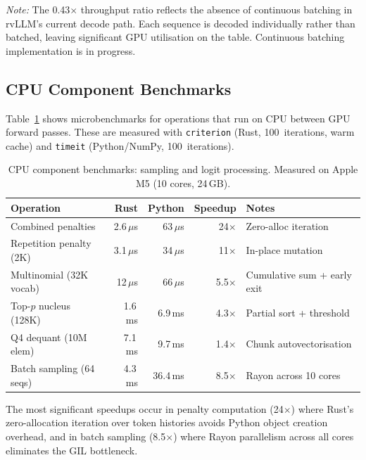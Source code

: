 \documentclass[11pt,a4paper]{article}
\newcommand{\thead}[1]{\textbf{\color{white}#1}}
\begin{document}
\smallskip\noindent\textit{Note:} The 0.43$\times$ throughput ratio reflects the
absence of continuous batching in rvLLM's current decode path. Each sequence is
decoded individually rather than batched, leaving significant GPU utilisation on the
table. Continuous batching implementation is in progress.

\subsection{CPU Component Benchmarks}

Table~\ref{tab:cpu_bench} shows microbenchmarks for operations that run on CPU between
GPU forward passes. These are measured with \texttt{criterion} (Rust, 100~iterations,
warm cache) and \texttt{timeit} (Python/NumPy, 100~iterations).

\begin{table}[t]
  \centering
  \caption{CPU component benchmarks: sampling and logit processing. Measured on Apple M5 (10 cores, 24\,GB).}
  \label{tab:cpu_bench}
  \small
  \begin{tabular}{@{}lrrrp{3.2cm}@{}}
    \toprule
    \rowcolor{HeaderGray} \thead{Operation} & \thead{Rust} & \thead{Python} & \thead{Speedup} & \thead{Notes} \\
    \midrule
    Combined penalties      & 2.6\,$\mu$s  & 63\,$\mu$s  & 24$\times$  & Zero-alloc iteration \\
    \rowcolor{gray!8}
    Repetition penalty (2K) & 3.1\,$\mu$s  & 34\,$\mu$s  & 11$\times$  & In-place mutation \\
    Multinomial (32K vocab)  & 12\,$\mu$s   & 66\,$\mu$s  & 5.5$\times$ & Cumulative sum + early exit \\
    \rowcolor{gray!8}
    Top-$p$ nucleus (128K)  & 1.6\,ms      & 6.9\,ms     & 4.3$\times$ & Partial sort + threshold \\
    Q4 dequant (10M elem)   & 7.1\,ms      & 9.7\,ms     & 1.4$\times$ & Chunk autovectorisation \\
    \rowcolor{gray!8}
    Batch sampling (64 seqs) & 4.3\,ms     & 36.4\,ms    & 8.5$\times$ & Rayon across 10 cores \\
    \bottomrule
  \end{tabular}
\end{table}

The most significant speedups occur in penalty computation (24$\times$) where Rust's
zero-allocation iteration over token histories avoids Python object creation overhead,
and in batch sampling (8.5$\times$) where Rayon parallelism across all cores eliminates
the GIL bottleneck.
\end{document}
